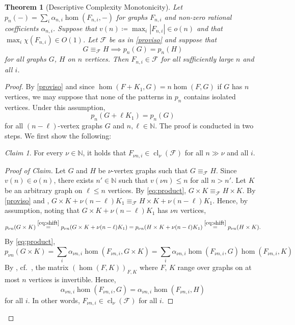 \documentclass[10pt,a4paper]{article}
\theoremstyle{definition}
\theoremstyle{plain}
\newtheorem{theorem}[definition]{Theorem}
\theoremstyle{remark}
\newtheorem{claim}{Claim}[definition]
\newenvironment{claimproof}[1][Proof of Claim]{\begin{proof}[#1] \renewcommand{\qedsymbol}{$\lrcorner$}}{ \end{proof}}
\DeclareMathOperator{\cl}{cl}
\begin{document}
	\begin{theorem}[Descriptive Complexity Monotonicity] \label{thm:complexity-monotonicty}
		Let $p_{n}(-) = \sum_i \alpha_{n,i} \hom(F_{n,i}, -)$ for graphs $F_{n,i}$ and non-zero rational coefficients $\alpha_{n,i}$.
		Suppose that $v(n) \coloneqq \max_i |F_{n,i}| \in o(n)$
		and that $\max_i \chi(F_{n,i}) \in O(1)$.
		Let $\mathcal{F}$ be as in \cref{proviso} and suppose that
		\[
			G \equiv_{\mathcal{F}} H \implies
			p_n(G) = p_n(H)
		\]
		for all graphs $G$, $H$ on $n$ vertices.
		Then $F_{n,i} \in \mathcal{F}$ for all sufficiently large $n$ and all $i$.
	\end{theorem}
	\begin{proof}
		By \cref{proviso}
		and since $\hom(F +K_1, G) = n \hom(F, G)$ if $G$ has $n$ vertices,
		we may suppose that none of the patterns in $p_n$ contains isolated vertices.
		Under this assumption,
		\begin{equation}\label{eq:shift}
			p_n(G + \ell K_1) = p_n(G)
		\end{equation}
		for all $(n-\ell)$-vertex graphs $G$ and $n, \ell \in \mathbb{N}$.
		The proof is conducted in two steps.
		We first show the following:
		\begin{claim}\label{claim:monotonicity}
			For every $\nu \in \mathbb{N}$,
			it holds that $F_{\nu n, i} \in \cl_\nu(\mathcal{F})$ for all $n \gg \nu$ and all $i$.
		\end{claim}
		\begin{claimproof}
			Let $G$ and $H$ be $\nu$-vertex graphs such that $G \equiv_{\mathcal{F}} H$.
			Since $v(n) \in o(n)$,
			there exists $n' \in \mathbb{N}$
			such that $v(\nu n) \leq n$ for all $n > n'$.
			Let $K$ be an arbitrary graph on $\ell \leq n$ vertices.
			By \cref{eq:product},
			$G \times K \equiv_{\mathcal{F}} H \times K$.
			By \cref{proviso} and \cite[Theorem~7]{seppelt_logical_2024},
			$G \times K + \nu (n - \ell)K_1 \equiv_{\mathcal{F}} H \times K +  \nu (n - \ell)K_1$.
			Hence, by assumption, noting that $G \times K +  \nu (n - \ell) K_1$ has $\nu n$ vertices, 
			\[
			p_{\nu n}(G \times K) \overset{\eqref{eq:shift}}{=} p_{\nu n}(G \times K +  \nu (n - \ell) K_1 ) = p_{\nu n}(H \times K +  \nu (n - \ell) K_1 )  \overset{\eqref{eq:shift}}{=}  p_{\nu n}(H \times K).
			\]
			By \cref{eq:product},
			\[
				p_{\nu n}(G \times K) = \sum_i \alpha_{\nu n,i} \hom(F_{\nu n,i}, G \times K)  = \sum_i \alpha_{\nu n,i} \hom(F_{\nu n,i}, G)  \hom(F_{\nu n,i}, K) 
			\]
			By \cite{lovasz_operations_1967}, cf.\ \cite[Lemma~6]{seppelt_logical_2024},
			the matrix $(\hom(F, K))_{F, K}$ where $F$, $K$ range over graphs on at most $n$ vertices is invertible.
			Hence,
			\[
				\alpha_{\nu n,i} \hom(F_{\nu n,i}, G) = \alpha_{\nu n,i} \hom(F_{\nu n,i}, H)
			\]
			for all $i$.
			In other words, $F_{\nu n,i} \in \cl_{\nu}(\mathcal{F})$ for all $i$. 
		\end{claimproof}
	

\end{proof}
\end{document}
